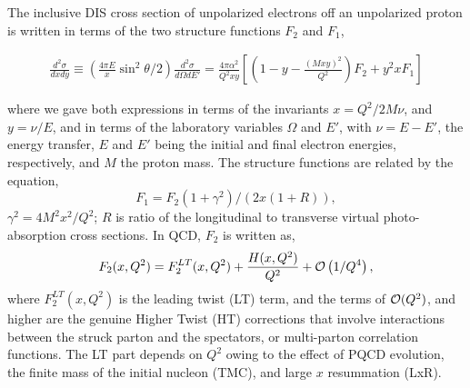 \documentclass[
twocolumn,
aps,prd,
nofootinbib,
superscriptaddress,
showpacs,ligh
tightenlines, 
]{revtex4}
\begin{document}

The inclusive DIS cross section of unpolarized electrons off
an unpolarized proton is written in terms of the two structure
functions $F_2$ and $F_1$, 
\begin{widetext}
\begin{eqnarray}
\label{xsect}
 \frac{d^2\sigma}{dx dy} \equiv  
\left(\frac{4 \pi E}{x} \sin^2 \theta/2 \right)  \frac{d^2\sigma}{d\Omega d E'} =  
\frac{4\pi\alpha^2}{Q^2 xy}
\left[
    \left(1-y-\frac{(Mxy)^2}{Q^2}\right)F_2 +
    y^2 x F_1
\right] 
\end{eqnarray}
\end{widetext}
where we gave both expressions in terms of the invariants $x=Q^2/2 M \nu$, and $y=\nu/E$, and in terms of the laboratory variables $\Omega$ and $E'$, with $\nu=E-E'$, the energy transfer, $E$ and $E'$ being the initial and final electron energies, respectively, and $M$ the proton mass.
The structure functions are related by the equation,  
\begin{equation}
\label{R}
F_1 = F_2(1+\gamma^2)/(2x(1+R)),
\end{equation}
$\gamma^2=4M^2x^2/Q^2$; $R$ is ratio of the longitudinal to transverse
virtual photo-absorption cross sections.  
In QCD, $F_2$ is written as,
%
\begin{eqnarray}
\label{t-exp} 
F_{2}(x,Q^2) = F_{2}^{LT}(x,Q^2) +
\frac{H(x,Q^2)}{Q^2} + {\cal O}\left(1/Q^4 \right),
\end{eqnarray}
%
where $F_{2}^{LT}(x,Q^2)$ is the leading twist (LT) term, and the terms of ${\cal O} (Q^{2})$, and  higher are the genuine  
Higher Twist (HT) corrections  
that involve interactions between the struck parton and the spectators, or
multi-parton correlation functions.
%
The LT part depends on $Q^2$ owing to the effect of PQCD evolution,  
the finite mass of the initial nucleon (TMC), and large $x$ resummation (LxR). 
\end{document}
